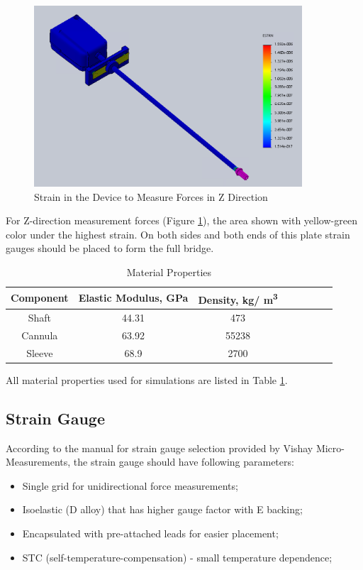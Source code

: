 \begin{figure}[h]
	\begin{center}
		\includegraphics[width=100mm]{fig/methods/z_dir_sim.png}
	\end{center}
	\vspace{-4mm}
	\caption[Strain in the Device to Measure Forces in Z Direction]
	{Strain in the Device to Measure Forces in Z Direction}
	\label{fig:Zdev}
	\vspace{-2mm}
\end{figure}

For Z-direction measurement forces (Figure \ref{fig:Zdev}), the area shown with yellow-green color under the highest strain. On both sides and both ends of this plate strain gauges should be placed to form the full bridge.

\begin{table}
\caption {Material Properties} \label{tab:matProp} 
\begin{center}
\begin{tabular}{ | c | c | c | c | c | c | c | c | } 
\hline
Component & Elastic Modulus, GPa & Density, kg/ m\textsuperscript{3} \\ 
\hline
Shaft & 44.31 & 473\\ 
\hline
Cannula & 63.92 & 55238 \\ 
\hline
Sleeve & 68.9 & 2700  \\ 
\hline
\end{tabular}
\end{center}
\end{table}

All material properties used for simulations are listed in Table \ref{tab:matProp}.

\subsection{Strain Gauge}
	\label{sec:SGReq}
	According to the manual for strain gauge selection provided by Vishay Micro-Measurements, the strain gauge should have following parameters:
\begin{itemize}
  \item Single grid for unidirectional force measurements;
  \item Isoelastic (D alloy) that has higher gauge factor with E backing;
  \item Encapsulated with pre-attached leads for easier placement;
  \item STC (self-temperature-compensation) - small temperature dependence;
\end{itemize}    
    
